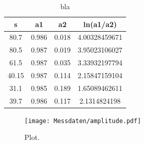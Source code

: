 \begin{table}
\centering
\caption{bla}
\label{tab:daempf}
\begin{tabular}{cccc}
  \toprule
s & a1 & a2 & ln(a1/a2) \\
\midrule
80.7 & 0.986 & 0.018 & 4.00328459671 \\
80.5 & 0.987 & 0.019 & 3.95023106027 \\
61.5 & 0.987 & 0.035 & 3.33932197794 \\
40.15 & 0.987 & 0.114 & 2.15847159104 \\
31.1 & 0.985 & 0.189 & 1.65089462611 \\
39.7 & 0.986 & 0.117 & 2.1314824198 \\
\bottomrule
\end{tabular}
\end{table}

\begin{figure}
  \centering
  \texttt{[image: Messdaten/amplitude.pdf]}
  \caption{Plot.}
  \label{fig:daempf}
\end{figure}
\FloatBarrier
